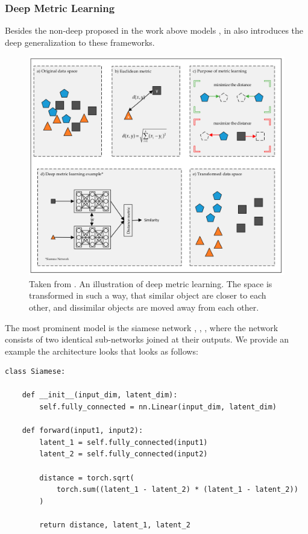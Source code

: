 \documentclass[a4paper,12pt,twoside,openright]{report}
\begin{document}
\subsubsection{Deep Metric Learning}

Besides the non-deep proposed in the work above models , in\cite{kaya19} also introduces the deep generalization to these frameworks.

\begin{figure}[H]
	\center
  \includegraphics[width=\linewidth]{./assets/relatedwork/metric_learning.png}
  \caption{Taken from \cite{kaya19}. An illustration of deep metric learning. The space is transformed in such a way, that similar object are closer to each other, and dissimilar objects are moved away from each other.}
  \label{fig:muse_translation}
\end{figure}

The most prominent model is the siamese network \cite{bromley94}, \cite{chopra05}, \cite{hadsell06}, where the network consists of two identical sub-networks joined at their outputs. 
We provide an example the architecture looks that looks as follows:

\begin{verbatim}
class Siamese:

    def __init__(input_dim, latent_dim):
        self.fully_connected = nn.Linear(input_dim, latent_dim)
        
    def forward(input1, input2):
        latent_1 = self.fully_connected(input1)
        latent_2 = self.fully_connected(input2)
        
        distance = torch.sqrt(
            torch.sum((latent_1 - latent_2) * (latent_1 - latent_2))
        )
        
        return distance, latent_1, latent_2
\end{verbatim}
\end{document}
